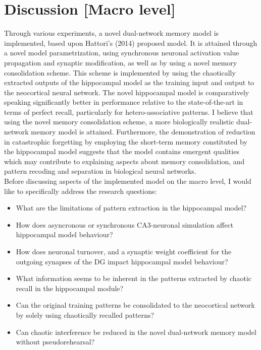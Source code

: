 
\chapter{Discussion [Macro level]}\label{chpt:discussion}


Through various experiments, a novel dual-network memory model is implemented, based upon Hattori's (2014) proposed model. It is attained through a novel model parametrization, using synchronous neuronal activation value propagation and synaptic modification, as well as by using a novel memory consolidation scheme. This scheme is implemented by using the chaotically extracted outputs of the hippocampal model as the training input and output to the neocortical neural network. The novel hippocampal model is comparatively speaking significantly better in performance relative to the state-of-the-art in terms of perfect recall, particularly for hetero-associative patterns. I believe that using the novel memory consolidation scheme, a more biologically realistic dual-network memory model is attained. Furthermore, the demonstration of reduction in catastrophic forgetting by employing the short-term memory constituted by the hippocampal model suggests that the model contains emergent qualities which may contribute to explaining aspects about memory consolidation, and pattern recoding and separation in biological neural networks.
\\


Before discussing aspects of the implemented model on the macro level, I would like to specifically address the research questions:

\begin{itemize}
    \item What are the limitations of pattern extraction in the hippocampal model?
    \item How does asyncronous or synchronous CA3-neuronal simulation affect hippocampal model behaviour?
    \item How does neuronal turnover, and a synaptic weight coefficient for the outgoing synapses of the DG impact hippocampal model behaviour?
    \item What information seems to be inherent in the patterns extracted by chaotic recall in the hippocampal module?
    \item Can the original training patterns be consolidated to the neocortical network by solely using chaotically recalled patterns?
    \item Can chaotic interference be reduced in the novel dual-network memory model without pseudorehearsal?
\end{itemize}

